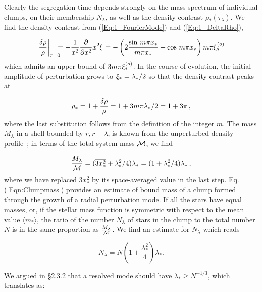 Clearly the segregation time depends strongly on the mass spectrum of individual clumps, on their membership $N_\lambda$, as well as the density contrast $\rho_\ast(\tau_\lambda)$. We find the density contrast from (\ref{Eq:1_FourierMode}) and (\ref{Eq:1_DeltaRho}),  

\[ \left.\frac{\delta\rho}{\rho}\right|_{\tau=0} \!\!\!\! = - \frac{1}{x^2}\frac{\partial}{\partial x^2} x^2\xi = - \left( 2 \frac{\sin\, m\pi x_\ast }{m\pi x_\ast} + \cos\,m\pi x_\ast \right) m\pi   \xi_\ast^{(o)}
\]
which admits an upper-bound of $3 m\pi \xi_\ast^{(o)}$. In the course of evolution, the initial amplitude of perturbation grows to $\xi_\ast = \lambda_\ast/2$ so that the density contrast peaks at 

\begin{equation} \label{Eqn:Densitypeak} 
  \rho_\ast = 1 + \frac{\delta\rho}{\rho} = 1 + 3 m\pi \lambda_\ast / 2 = 1 + 3\pi\, ,
\end{equation}
where the last substitution follows from the definition of the integer $m$. The mass $M_\lambda$ in a shell bounded by $r, r+ \lambda$, is known from the unperturbed density profile~; in terms of the total system mass ${\cal M}$, we find 

\begin{equation} \label{Eqn:Clumpmass} 
   \frac{M_\lambda}{{\cal M} } = ( \overline{3 x_\ast^2} + \lambda_\ast^2/4 ) \lambda_\ast = ( 1 + \lambda_\ast^2/4) \lambda_\ast \, , 
\end{equation}
where we have replaced $3x_\ast^2$ by its space-averaged value in  the last step.  Eq. (\ref{Eqn:Clumpmass}) provides an estimate of  bound mass of a clump formed through the growth of a radial perturbation mode. If all the stars have equal masses, or, if the stellar mass function is symmetric with respect to the mean value $\langle m_\ast\rangle$, the ratio of the number $N_\lambda$ of stars in the clump to the total number $N$ is in the same proportion as $\frac{M_\lambda}{\cal M}$. We find an estimate for $N_\lambda$ which reads 

\begin{equation} \label{Eqn:Clumpn} 
   N_\lambda = N \left( 1 + \frac{\lambda_\ast^2}{4} \right) \lambda_* .
\end{equation} 

We argued in \S2.3.2 that a resolved mode should have $\lambda_\ast \ge N^{-1/3}$, which translates as: 

